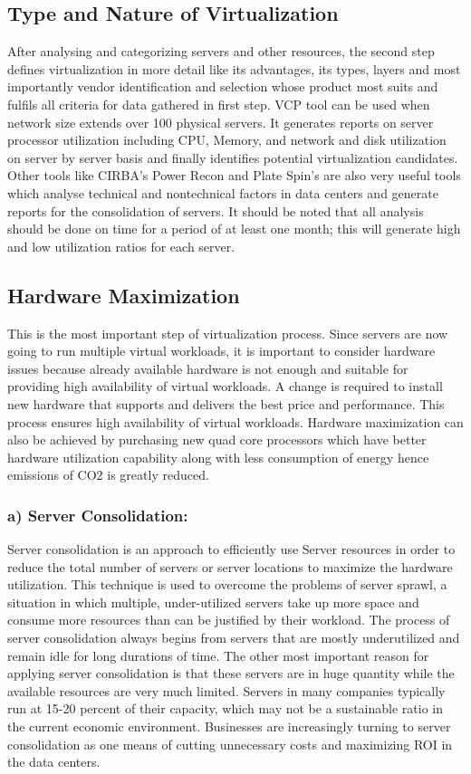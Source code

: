 \documentclass[12pt,a4paper]{report}
\begin{document}
\subsection{Type and Nature of Virtualization} 
After analysing and categorizing servers and other resources, the second step defines virtualization in more detail like its advantages, its types, layers and most importantly vendor identification and selection whose product most suits and fulfils all criteria for data gathered in first step. VCP tool can be used when network size extends over 100 physical servers. It generates reports on server processor utilization including CPU, Memory, and network and disk utilization on server by server basis and finally identifies potential virtualization candidates. Other tools like CIRBA’s Power Recon and Plate Spin’s are also very useful tools which analyse technical and nontechnical factors in data centers and generate reports for the consolidation of servers. It should be noted that all analysis should be done on time for a period of at least one month; this will generate high and low utilization ratios for each server.



\subsection{Hardware Maximization}
This is the most important step of virtualization process. Since servers are now going to run multiple virtual workloads, it is important to consider hardware issues because already available hardware is not enough and suitable for providing high availability of virtual workloads. A change is required to install new hardware that supports and delivers the best price and performance. This process ensures high availability of virtual workloads. Hardware maximization can also be achieved by purchasing new quad core processors which have better hardware utilization capability along with less consumption of energy hence emissions of CO2 is greatly reduced. \\
\subsubsection{a) Server Consolidation:}
 Server consolidation is an approach to efficiently use Server resources in order to reduce the total number of servers or server locations to maximize the hardware utilization. This technique is used to overcome the problems of server sprawl, a situation in which multiple, under-utilized servers take up more space and consume more resources than can be justified by their workload. The process of server consolidation always begins from servers that are mostly underutilized and remain idle for long durations of time. The other most important reason for applying server consolidation is that these servers are in huge quantity while the available resources are very much limited. Servers in many companies typically run at 15-20 percent of their capacity, which may not be a sustainable ratio in the current economic environment. Businesses are increasingly turning to server consolidation as one means of cutting unnecessary costs and maximizing ROI in the data centers.
 
\end{document}
